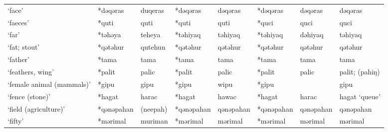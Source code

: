 \begin{landscape}
\begin{longtable}[c]{@{}p{3cm}<{\raggedright}p{2.75cm}<{\raggedright}p{2.75cm}<{\raggedright}p{2.75cm}<{\raggedright}p{2.75cm}<{\raggedright}p{2.75cm}<{\raggedright}p{2.75cm}<{\raggedright}p{2.75cm}<{\raggedright}@{}}
`face'                                               & *dəqəras     & duqeras                       & *dəqəras       & dəqəras                    & *dəqəras         & dəqəras                  & dəqəras                           \\
`faeces'                                             & *quti        & quti                          & *quti          & quti                       & *quci            & quci                     & quci                              \\
`far'                                                & *təhəya      & teheya                        & *təhiyaq       & təhiyaq                    & *təhiyaq         & dəhiyaq                  & təhiyaq                           \\
`fat; stout'                                         & *qətəhur     & qutehun                       & *qətəhur       & qətəhur                    & *qətəhur         & qətəhur                  & qətəhur                           \\
`father'                                             & *tama        & tama                          & *tama          & tama                       & *tama            & tama                     & tama                              \\
`feathers, wing'                                     & *palit       & palic                         & *palit         & palic                      & *palit           & palic                    & palit; (pahiŋ)                    \\
`female animal (mammals)'                            & *gipu        & gipu                          & *gipu          & wipu                       & *gipu            &                          & gipu                              \\
`fence (stone)'                                      & *hagat       & harac                         & *hagat         & hawac                      & *hagat           & harac                    & hagat `queue'                     \\
`field (agriculture)'                                & *qənəpahan   & (neepah)                      & *qənəpahan     & qənəpahan                  & *qənəpahan       & qənəpahan                & qənəpahan                         \\
`fifty'                                              & *mərimal     & muriman                       & *mərimal       & mərimal                    & *mərimal         & mərimal                  & mərimal                           \\

\end{longtable}
\end{landscape}
